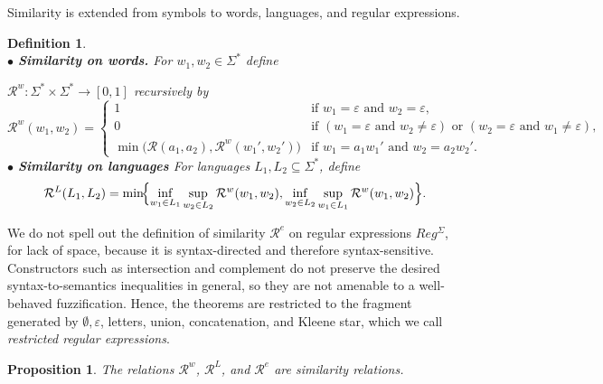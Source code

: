 \documentclass{easychair}
\newtheorem{definition}{Definition}
\newtheorem{proposition}{Proposition}
\begin{document}
Similarity is extended from symbols to words, languages, and regular expressions. 
\begin{definition}\hfill\\
$\bullet$ {\bf Similarity on words.}
For $w_1,w_2\in\Sigma^\ast$ define

 $
\mathcal R^w:\Sigma^\ast\times\Sigma^\ast\to[0,1]$
recursively by\\ $
\mathcal R^w(w_1,w_2)=
\begin{cases}
1 & \text{if } w_1=\varepsilon \text{ and } w_2=\varepsilon,\\[2pt]
0 & \text{if } (w_1=\varepsilon \text{ and } w_2\neq\varepsilon)
\text{ or } (w_2=\varepsilon \text{ and } w_1\neq\varepsilon),\\[4pt]
\min\!\bigl(\mathcal R(a_1,a_2),\mathcal R^w(w_1',w_2')\bigr)
& \text{if } w_1=a_1w_1' \text{ and } w_2=a_2w_2'.

\end{cases}$\smallskip\\
$\bullet$ {\bf Similarity on languages}
For languages $L_1,L_2\subseteq\Sigma^\ast$, define
\[
\mathcal R^L(L_1,L_2)
=
\min\!\Bigl\{
\inf_{w_1\in L_1}\sup_{w_2\in L_2}\mathcal R^w(w_1,w_2),
\inf_{w_2\in L_2}\sup_{w_1\in L_1}\mathcal R^w(w_1,w_2)
\Bigr\}.
\]\end{definition} We do not spell out the definition of similarity $\mathcal R^e$ on regular
expressions $Reg^\Sigma$, for lack of space, because it is syntax-directed and therefore
syntax-sensitive. Constructors such as intersection and complement do not preserve the
desired syntax-to-semantics inequalities in general, so they are not amenable to a well-behaved fuzzification. Hence, the theorems are restricted to the fragment generated by $\emptyset,\varepsilon$,
letters, union, concatenation, and Kleene star, which we call {\em restricted regular expressions}. 

\begin{proposition} The relations $\mathcal R^w$, $\mathcal R^L$, and $\mathcal R^e$ are similarity relations. 
\end{proposition}
\end{document}
